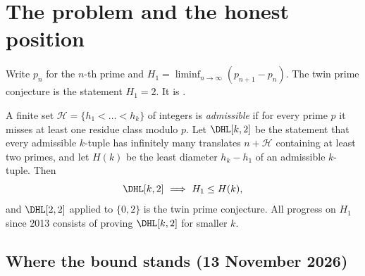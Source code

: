 \section{The problem and the honest position}

Write $p_n$ for the $n$-th prime and $H_1=\liminf_{n\to\infty}(p_{n+1}-p_n)$.
The twin prime conjecture is the statement $H_1=2$. It is .

A finite set $\mathcal H=\{h_1<\dots<h_k\}$ of integers is \emph{admissible} if
for every prime $p$ it misses at least one residue class modulo $p$. Let
$\DHL[k,2]$ be the statement that every admissible $k$-tuple has infinitely
many translates $n+\mathcal H$ containing at least two primes, and let $H(k)$
be the least diameter $h_k-h_1$ of an admissible $k$-tuple. Then
\begin{equation}\label{eq:reduction}
\DHL[k,2]\ \Longrightarrow\ H_1\le H(k),
\end{equation}
and $\DHL[2,2]$ applied to $\{0,2\}$ is the twin prime conjecture. All progress
on $H_1$ since 2013 consists of proving $\DHL[k,2]$ for smaller $k$.

\subsection*{Where the bound stands (13 November 2026)}

